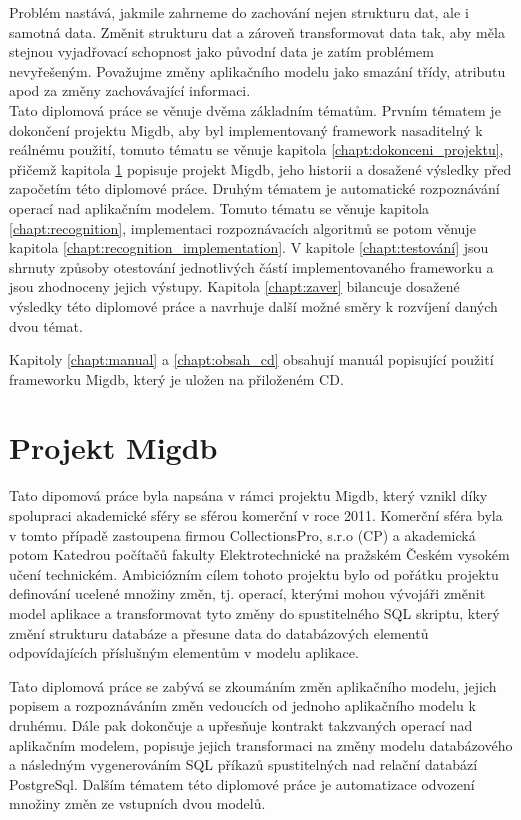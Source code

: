 \documentclass[11pt,twoside,a4paper]{book}
\begin{document}
Problém nastává, jakmile zahrneme do zachování nejen strukturu dat, ale i
samotná data. Změnit strukturu dat a zároveň transformovat data tak, aby měla
stejnou vyjadřovací schopnost jako původní data je zatím problémem nevyřešeným.
Považujme změny aplikačního modelu jako smazání třídy, atributu apod za změny
zachovávající informaci. \\

Tato diplomová práce se věnuje dvěma základním tématům. Prvním tématem je
dokončení projektu Migdb, aby byl implementovaný framework nasaditelný k
reálnému použití, tomuto tématu se věnuje kapitola
\ref{chapt:dokonceni_projektu}, přičemž kapitola \ref{chapt:projekt_migdb}
popisuje projekt Migdb, jeho historii a dosažené výsledky před započetím této
diplomové práce. Druhým tématem je automatické rozpoznávání operací nad
aplikačním modelem. Tomuto tématu se věnuje kapitola \ref{chapt:recognition},
implementaci rozpoznávacích algoritmů se potom věnuje kapitola
\ref{chapt:recognition_implementation}. V kapitole \ref{chapt:testování} jsou
shrnuty způsoby otestování jednotlivých částí implementovaného frameworku a
jsou zhodnoceny jejich výstupy. Kapitola \ref{chapt:zaver} bilancuje dosažené
výsledky této diplomové práce a navrhuje další možné směry k rozvíjení daných
dvou témat.

Kapitoly \ref{chapt:manual} a \ref{chapt:obsah_cd} obsahují
manuál popisující použití frameworku Migdb, který je uložen na přiloženém CD.



\chapter{Projekt Migdb}\label{chapt:projekt_migdb}

Tato dipomová práce byla napsána v rámci projektu Migdb, který vznikl díky
spolupraci akademické sféry se sférou komerční v roce 2011. Komerční sféra byla
v tomto případě zastoupena firmou CollectionsPro, s.r.o (CP) a
akademická potom Katedrou počítačů fakulty Elektrotechnické na pražském
Českém vysokém učení technickém. Ambiciózním cílem tohoto projektu bylo od
pořátku projektu definování ucelené množiny změn, tj. operací, kterými mohou
vývojáři změnit model aplikace a transformovat tyto změny do spustitelného SQL
skriptu, který změní strukturu databáze a přesune data do
databázových elementů odpovídajících příslušným elementům v modelu aplikace.

Tato diplomová práce se zabývá se zkoumáním změn aplikačního modelu, jejich
popisem a rozpoznáváním změn vedoucích od jednoho aplikačního modelu
k druhému. Dále pak dokončuje a upřesňuje kontrakt takzvaných operací nad
aplikačním modelem, popisuje jejich transformaci na změny modelu databázového
a následným vygenerováním SQL příkazů spustitelných nad relační databází
PostgreSql. Dalším tématem této diplomové práce je automatizace odvození množiny
změn ze vstupních dvou modelů.\\
\end{document}
